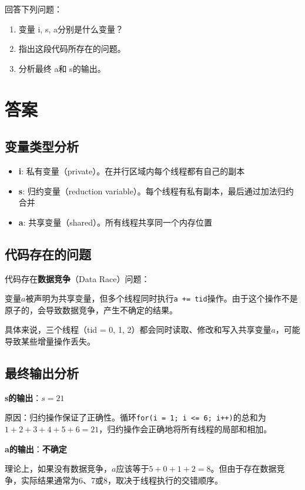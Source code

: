 回答下列问题：
\begin{enumerate}
    \item 变量 i, s, a分别是什么变量？
    \item 指出这段代码所存在的问题。
    \item 分析最终 a和 s的输出。
\end{enumerate}

\section{答案}
\subsection{变量类型分析}

\begin{itemize}
    \item \textbf{i}: 私有变量（private）。在并行区域内每个线程都有自己的副本
    \item \textbf{s}: 归约变量（reduction variable）。每个线程有私有副本，最后通过加法归约合并
    \item \textbf{a}: 共享变量（shared）。所有线程共享同一个内存位置
\end{itemize}

\subsection{代码存在的问题}

代码存在\textbf{数据竞争}（Data Race）问题：

变量$a$被声明为共享变量，但多个线程同时执行\texttt{a += tid}操作。由于这个操作不是原子的，会导致数据竞争，产生不确定的结果。

具体来说，三个线程（tid = 0, 1, 2）都会同时读取、修改和写入共享变量$a$，可能导致某些增量操作丢失。

\subsection{最终输出分析}

\textbf{s的输出}：$s = 21$

原因：归约操作保证了正确性。循环\texttt{for(i = 1; i <= 6; i++)}的总和为$1+2+3+4+5+6 = 21$，归约操作会正确地将所有线程的局部和相加。

\textbf{a的输出}：\textbf{不确定}

理论上，如果没有数据竞争，$a$应该等于$5 + 0 + 1 + 2 = 8$。但由于存在数据竞争，实际结果通常为6、7或8，取决于线程执行的交错顺序。

